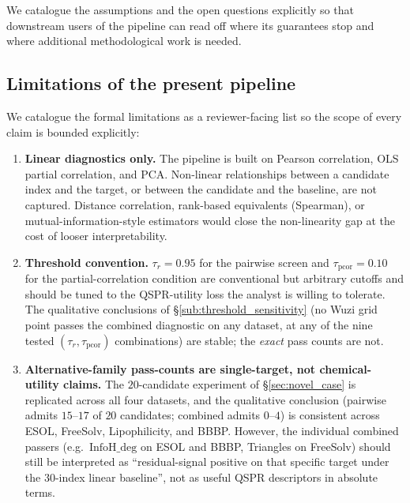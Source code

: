 \documentclass[STIX1COL]{WileyNJDv5}
\theoremstyle{definition}
\begin{document}
We catalogue the assumptions and the open questions explicitly so
that downstream users of the pipeline can read off where its
guarantees stop and where additional methodological work is needed.

\subsection{Limitations of the present pipeline}\label{sub:limitations}

We catalogue the formal limitations as a reviewer-facing list so
the scope of every claim is bounded explicitly:

\begin{enumerate}
\item \textbf{Linear diagnostics only.} The pipeline is built on
Pearson correlation, OLS partial correlation, and PCA. Non-linear
relationships between a candidate index and the target, or between
the candidate and the baseline, are not captured. Distance
correlation, rank-based equivalents (Spearman), or
mutual-information-style estimators would close the non-linearity
gap at the cost of looser interpretability.

\item \textbf{Threshold convention.} $\tau_r = 0.95$ for the
pairwise screen and $\tau_{\mathrm{pcor}} = 0.10$ for the
partial-correlation condition are conventional but arbitrary
cutoffs and should be tuned to the QSPR-utility loss the analyst
is willing to tolerate. The qualitative conclusions of
\S\ref{sub:threshold_sensitivity} (no Wuzi grid point passes the
combined diagnostic on any dataset, at any of the nine tested
$(\tau_r, \tau_{\mathrm{pcor}})$ combinations) are stable; the
\emph{exact} pass counts are not.

\item \textbf{Alternative-family pass-counts are
single-target, not chemical-utility claims.} The $20$-candidate
experiment of \S\ref{sec:novel_case} is replicated across all four
datasets, and the qualitative conclusion (pairwise admits $15$--$17$
of $20$ candidates; combined admits $0$--$4$) is consistent across
ESOL, FreeSolv, Lipophilicity, and BBBP. However, the individual
combined passers (e.g.\ $\mathrm{InfoH\_deg}$ on ESOL and BBBP,
Triangles on FreeSolv) should still be interpreted as
``residual-signal positive on that specific target under the
$30$-index linear baseline'', not as useful QSPR descriptors in
absolute terms.


\end{enumerate}
\end{document}
